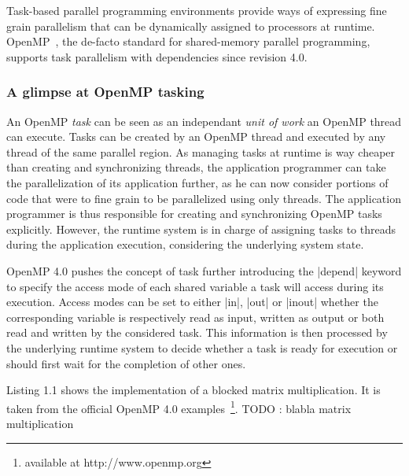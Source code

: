 \documentclass{Styles/llncs}
\begin{document}
Task-based parallel programming environments provide ways of expressing fine grain parallelism that can be dynamically assigned to processors at runtime.
OpenMP~\cite{openmp40}, the de-facto standard for shared-memory parallel programming, supports task parallelism with dependencies since revision 4.0.

\subsubsection{A glimpse at OpenMP tasking}

An OpenMP \emph{task} can be seen as an independant \emph{unit of work} an OpenMP thread can execute.
Tasks can be created by an OpenMP thread and executed by any thread of the same parallel region. 
As managing tasks at runtime is way cheaper than creating and synchronizing threads, the application programmer can take the parallelization of its application further, as he can now consider portions of code that were to fine grain to be parallelized using only threads.
The application programmer is thus responsible for creating and synchronizing OpenMP tasks explicitly. 
However, the runtime system is in charge of assigning tasks to threads during the application execution, considering the underlying system state.

OpenMP 4.0 pushes the concept of task further introducing the |depend| keyword to specify the access mode of each shared variable a task will access during its execution. 
Access modes can be set to either |in|, |out| or |inout| whether the corresponding variable is respectively read as input, written as output or both read and written by the considered task. 
This information is then processed by the underlying runtime system to decide whether a task is ready for execution or should first wait for the completion of other ones.

Listing 1.1 shows the implementation of a blocked matrix multiplication. It is
taken from the official OpenMP 4.0 examples~\footnote{available at http://www.openmp.org}.
TODO : blabla matrix multiplication

\end{document}
